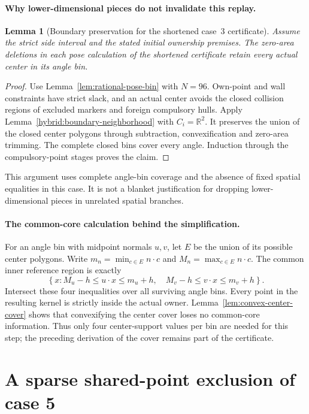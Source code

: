 \documentclass[11pt]{article}
\newtheorem{lemma}[theorem]{Lemma}
\begin{document}
\paragraph{Why lower-dimensional pieces do not invalidate this replay.}
\begin{lemma}[Boundary preservation for the shortened case~3 certificate]
\label{lem:case-three-boundaries}
Assume the strict side interval and the stated initial ownership premises.
The zero-area deletions in each pose calculation of the shortened
certificate retain every actual center in its angle bin.
\end{lemma}
\begin{proof}
Use Lemma~\ref{lem:rational-pose-bin} with $N=96$. Own-point and wall
constraints have strict slack, and an actual center avoids the closed
collision regions of excluded markers and foreign compulsory hulls.
Apply Lemma~\ref{hybrid:boundary-neighborhood} with $C_i=\mathbb R^2$.
It preserves the union of the closed center polygons through subtraction,
convexification and zero-area trimming. The complete closed bins cover
every angle. Induction through the compulsory-point stages proves the
claim.
\end{proof}
This argument uses complete angle-bin coverage and the absence of fixed
spatial equalities in this case.  It is not a blanket justification for
dropping lower-dimensional pieces in unrelated spatial branches.

\paragraph{The common-core calculation behind the simplification.}
For an angle bin with midpoint normals $u,v$, let $E$ be the union of its
possible center polygons.  Write
$m_n=\min_{c\in E}n\cdot c$ and
$M_n=\max_{c\in E}n\cdot c$.  The common inner reference region is exactly
\[
 \left\{x:
 M_u-h\leq u\cdot x\leq m_u+h,
 \quad M_v-h\leq v\cdot x\leq m_v+h\right\}.
\]
Intersect these four inequalities over all surviving angle bins.  Every
point in the resulting kernel is strictly inside the actual owner.
Lemma~\ref{lem:convex-center-cover} shows that convexifying the center
cover loses no common-core information. Thus only four center-support
values per bin are needed for this step; the preceding derivation of the
cover remains part of the certificate.

\section{A sparse shared-point exclusion of case 5}
\label{sec:sparse-case-five}
\end{document}
